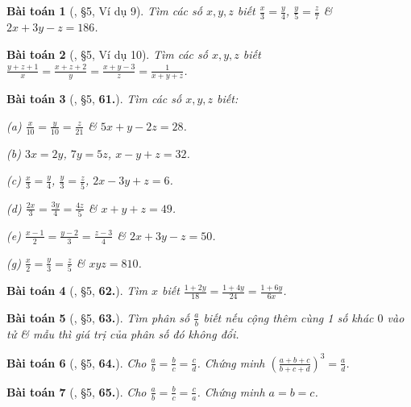 \documentclass{article}
\numberwithin{equation}{section}
\newtheorem{baitoan}{Bài toán}
\begin{document}
\begin{baitoan}[\cite{Binh_Toan_7_tap_1}, \S5, Ví dụ 9]
	Tìm các số $x,y,z$ biết $\frac{x}{3} = \frac{y}{4}$, $\frac{y}{5} = \frac{z}{7}$ \& $2x + 3y - z = 186$.
\end{baitoan}

\begin{baitoan}[\cite{Binh_Toan_7_tap_1}, \S5, Ví dụ 10]
	Tìm các số $x,y,z$ biết $\frac{y + z + 1}{x} = \frac{x + z + 2}{y} = \frac{x + y - 3}{z} = \frac{1}{x + y + z}$.
\end{baitoan}

\begin{baitoan}[\cite{Binh_Toan_7_tap_1}, \S5, \textbf{61.}]
	Tìm các số $x,y,z$ biết:
	\begin{enumerate*}
		\item[(a)] $\frac{x}{10} = \frac{y}{10} = \frac{z}{21}$ \& $5x + y - 2z = 28$.
		\item[(b)] $3x = 2y$, $7y = 5z$, $x - y + z = 32$.
		\item[(c)] $\frac{x}{3} = \frac{y}{4}$, $\frac{y}{3} = \frac{z}{5}$, $2x - 3y + z = 6$.
		\item[(d)] $\frac{2x}{3} = \frac{3y}{4} = \frac{4z}{5}$ \& $x + y + z = 49$.
		\item[(e)] $\frac{x - 1}{2} = \frac{y - 2}{3} = \frac{z - 3}{4}$ \& $2x + 3y - z = 50$.
		\item[(g)] $\frac{x}{2} = \frac{y}{3} = \frac{z}{5}$ \& $xyz = 810$.
	\end{enumerate*}
\end{baitoan}

\begin{baitoan}[\cite{Binh_Toan_7_tap_1}, \S5, \textbf{62.}]
	Tìm $x$ biết $\frac{1 + 2y}{18} = \frac{1 + 4y}{24} = \frac{1 + 6y}{6x}$.
\end{baitoan}

\begin{baitoan}[\cite{Binh_Toan_7_tap_1}, \S5, \textbf{63.}]
	Tìm phân số $\frac{a}{b}$ biết nếu cộng thêm cùng 1 số khác $0$ vào tử \& mẫu thì giá trị của phân số đó không đổi.
\end{baitoan}

\begin{baitoan}[\cite{Binh_Toan_7_tap_1}, \S5, \textbf{64.}]
	Cho $\frac{a}{b} = \frac{b}{c} = \frac{c}{d}$. Chứng minh $\left(\frac{a + b + c}{b + c + d}\right)^3 = \frac{a}{d}$.
\end{baitoan}

\begin{baitoan}[\cite{Binh_Toan_7_tap_1}, \S5, \textbf{65.}]
	Cho $\frac{a}{b} = \frac{b}{c} = \frac{c}{a}$. Chứng minh $a = b = c$.
\end{baitoan}
\end{document}
